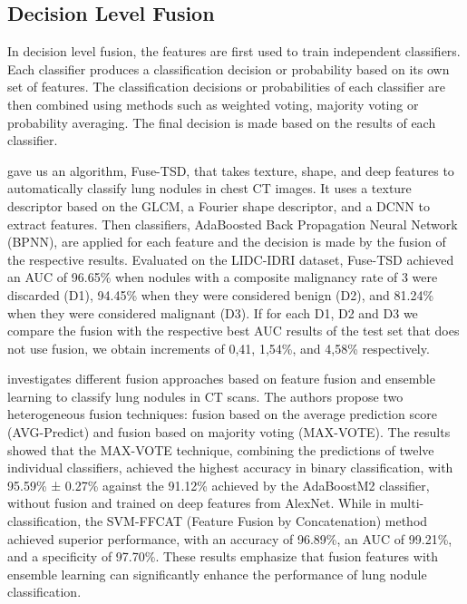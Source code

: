\subsection{Decision Level Fusion}
In decision level fusion, the features are first used to train independent classifiers. Each classifier produces a classification decision or probability based on its own set of features.
The classification decisions or probabilities of each classifier are then combined using methods such as weighted voting, majority voting or probability averaging.
The final decision is made based on the results of each classifier.

\citet{xie_fusing_2018} gave us an algorithm, Fuse-TSD, that takes texture, shape, and deep features to automatically classify lung nodules in chest CT images. It uses a texture descriptor based on the GLCM, a Fourier shape descriptor, and a DCNN to extract features. Then classifiers, AdaBoosted Back Propagation Neural Network (BPNN), are applied for each feature and the decision is made by the fusion of the respective results. Evaluated on the LIDC-IDRI dataset, Fuse-TSD achieved an AUC of 96.65\% when nodules with a composite malignancy rate of 3 were discarded (D1), 94.45\% when they were considered benign (D2), and 81.24\% when they were considered malignant (D3). If for each D1, D2 and D3 we compare the fusion with the respective best AUC results of the test set that does not use fusion, we obtain increments of 0,41, 1,54\%, and 4,58\% respectively.

\citet{muzammil_pulmonary_2021} investigates different fusion approaches based on feature fusion and ensemble learning to classify lung nodules in CT scans. The authors propose two heterogeneous fusion techniques: fusion based on the average prediction score (AVG-Predict) and fusion based on majority voting (MAX-VOTE). The results showed that the MAX-VOTE technique, combining the predictions of twelve individual classifiers, achieved the highest accuracy in binary classification, with 95.59\% ± 0.27\% against the 91.12\% achieved by the AdaBoostM2 classifier, without fusion and trained on deep features from AlexNet. While in multi-classification, the SVM-FFCAT (Feature Fusion by Concatenation) method achieved superior performance, with an accuracy of 96.89\%, an AUC of 99.21\%, and a specificity of 97.70\%. These results emphasize that fusion features with ensemble learning can significantly enhance the performance of lung nodule classification.

